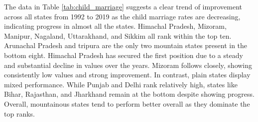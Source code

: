 

The data in Table \ref{tab:child_marriage} suggests a clear trend of improvement across all states from 1992 to 2019 as the child marriage rates are decreasing, indicating progress in almost all the states. Himachal Pradesh, Mizoram, Manipur, Nagaland, Uttarakhand, and Sikkim all rank within the top ten. Arunachal Pradesh and tripura are the only two mountain states present in the bottom eight. Himachal Pradesh has secured the first position due to a steady and substantial decline in values over the years. Mizoram follows closely, showing consistently low values and strong improvement. In contrast, plain states display mixed performance. While Punjab and Delhi rank relatively high, states like Bihar, Rajasthan, and Jharkhand remain at the bottom despite showing progress. Overall, mountainous states tend to perform better overall as they dominate the top ranks.

